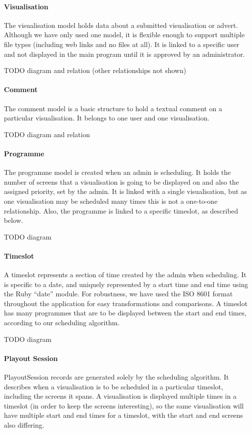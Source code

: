 \documentclass[a4paper, titlepage]{article}
\begin{document}
\paragraph{Visualisation}
The visualisation model holds data about a submitted visualisation or advert. Although we have only used
one model, it is flexible enough to support multiple file types (including web links and no files at 
all). It is linked to a specific user and not displayed in the main program until it is approved by an 
administrator.

TODO diagram and relation (other relationships not shown)


\paragraph{Comment}
The comment model is a basic structure to hold a textual comment on a particular visualisation. It 
belongs to one user and one visualisation. 

TODO diagram and relation


\paragraph{Programme}
The programme model is created when an admin is scheduling. It holds the number of screens that a 
visualisation is going to be displayed on and also the assigned priority, set by the admin. It is linked
with a single visualisation, but as one visualisation may be scheduled many times this is not a 
one-to-one relationship. Also, the programme is linked to a specific timeslot, as described below.

TODO diagram

\paragraph{Timeslot}
A timeslot represents a section of time created by the admin when scheduling. It is specific to a date,
and uniquely represented by a start time and end time using the Ruby ``date'' module. For robustness,
we have used the ISO 8601 format throughout the application for easy transformations and comparisons. A 
timeslot has many programmes that are to be displayed between the start and end times, according to our 
scheduling algorithm.

TODO diagram


\paragraph{Playout Session}
PlayoutSession records are generated solely by the scheduling algorithm. It describes when a 
visualisation is to be scheduled in a particular timeslot, including the screens it spans. A 
visualisation is displayed multiple times in a timeslot (in order to keep the screens interesting),
so the same visualisation will have multiple start and end times for a timeslot, with the start and
end screens also differing.
\end{document}
